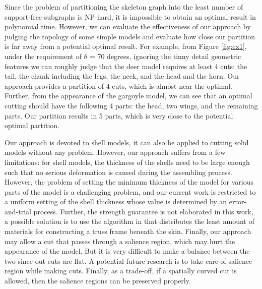 Since the problem of partitioning the skeleton graph into the least number of support-free subgraphs is NP-hard, it is impossible to obtain an optimal result in polynomial time. However, we can evaluate the effectiveness of our approach by judging the topology of some simple models and evaluate how close our partition is far away from a potential optimal result. For example, from Figure \ref{fig:ex1}, under the requirement of $\theta$ = 70 degrees, ignoring the tinny detail geometric features we can roughly judge that the deer model requires at least 4 cuts: the tail, the chunk including the legs, the neck, and the head and the horn. Our approach provides a partition of 4 cuts, which is almost near the optimal. Further, from the appearance of the gargoyle model, we can see that an optimal cutting should have the following 4 parts: the head, two wings, and the remaining parts. Our partition results in 5 parts, which is very close to the potential optimal partition.

Our approach is devoted to shell models, it can also be applied to cutting solid models without any problem. However, our approach suffers from a few limitations: for shell models, the thickness of the shells need to be large enough such that no serious deformation is caused during the assembling process. However, the problem of setting the minimum thickness of the model for various parts of the model is a challenging problem, and our current work is restricted to a uniform setting of the shell thickness whose value is determined by an error-and-trial process. Further, the strength guarantee is not elaborated in this work, a possible solution is to use the algorithm in \cite{WangWYLTTDCL13} that distributes the least amount of materials for constructing a truss frame beneath the skin. Finally, our approach may allow a cut that passes through a salience region, which may hurt the appearance of the model. But it is very difficult to make a balance between the two since out cuts are flat. A potential future research is to take care of salience region while making cuts. Finally, as a trade-off, if a spatially curved cut is allowed, then the salience regions can be preserved properly.
